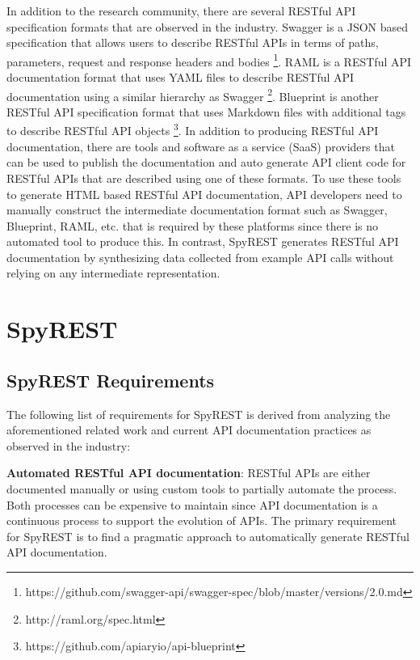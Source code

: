\documentclass[conference]{IEEEtran}
\begin{document}
In addition to the research community, there are several RESTful API specification formats that are observed in the industry. Swagger is a JSON based specification that allows users to describe RESTful APIs in terms of paths, parameters, request and response headers and bodies \footnote{https://github.com/swagger-api/swagger-spec/blob/master/versions/2.0.md}. RAML is a RESTful API documentation format that uses YAML files to describe RESTful API documentation using a similar hierarchy as Swagger \footnote{http://raml.org/spec.html}. Blueprint is another RESTful API specification format that uses Markdown files with additional tags to describe RESTful API objects \footnote{https://github.com/apiaryio/api-blueprint}. In addition to producing RESTful API documentation, there are tools and software as a service (SaaS) providers that can be used to publish the documentation and auto generate API client code for RESTful APIs that are described using one of these formats. To use these tools to generate HTML based RESTful API documentation, API developers need to manually construct the intermediate documentation format such as Swagger, Blueprint, RAML, etc. that is required by these platforms since there is no automated tool to produce this. In contrast, SpyREST generates RESTful API documentation by synthesizing data collected from example API calls without relying on any intermediate representation.


\section{SpyREST} %
\label{sec:spyrest}

\subsection{SpyREST Requirements} %
\label{sub:spyrest_requirements}

The following list of requirements for SpyREST is derived from analyzing the aforementioned related work and current API documentation practices as observed in the industry:


  \textbf{Automated RESTful API documentation}: RESTful APIs are either documented manually or using custom tools to partially automate the process. Both processes can be expensive to maintain since API documentation is a continuous process to support the evolution of APIs. The primary requirement for SpyREST is to find a pragmatic approach to automatically generate RESTful API documentation.
\end{document}
